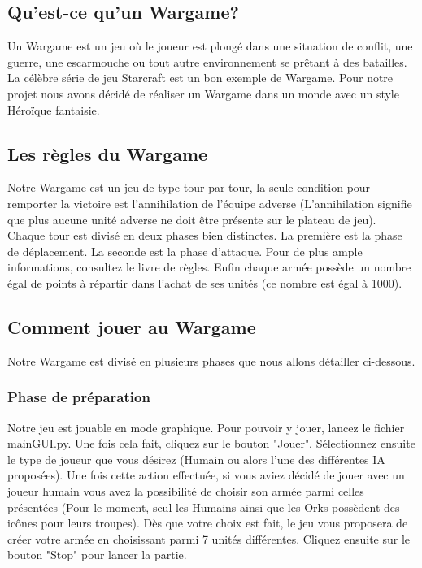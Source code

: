 \documentclass{article}
\begin{document}
 \subsection{Qu'est-ce qu'un Wargame?}
 Un Wargame est un jeu où le joueur est plongé dans une situation de conflit, une guerre, une escarmouche ou tout autre environnement se prêtant à des batailles. La célèbre série de jeu Starcraft est un bon exemple de Wargame. Pour notre projet nous avons décidé de réaliser un Wargame dans un monde avec un style Héroïque fantaisie.
 \subsection{Les règles du Wargame}
 Notre Wargame est un jeu de type tour par tour, la seule condition pour remporter la victoire est l'annihilation de l'équipe adverse (L'annihilation signifie que plus aucune unité adverse ne doit être présente sur le plateau de jeu). Chaque tour est divisé en deux phases bien distinctes. La première est la phase de déplacement. La seconde est la phase d'attaque. Pour de plus ample informations, consultez le livre de règles. Enfin chaque armée possède un nombre égal de points à répartir dans l'achat de ses unités (ce nombre est égal à 1000).
 
 \subsection{Comment jouer au Wargame}
 Notre Wargame est divisé en plusieurs phases que nous allons détailler ci-dessous.

 \subsubsection{Phase de préparation}
  Notre jeu est jouable en mode graphique. Pour pouvoir y jouer, lancez le fichier mainGUI.py. Une fois cela fait, cliquez sur le bouton "Jouer". Sélectionnez ensuite le type de joueur que vous désirez (Humain ou alors l'une des différentes IA proposées). Une fois cette action effectuée, si vous aviez décidé de jouer avec un joueur humain vous avez la possibilité de choisir son armée parmi celles présentées (Pour le moment, seul les Humains ainsi que les Orks possèdent des icônes pour leurs troupes). Dès que votre choix est fait, le jeu vous proposera de créer votre armée en choisissant parmi 7 unités différentes. Cliquez ensuite sur le bouton "Stop" pour lancer la partie.
  
\end{document}
